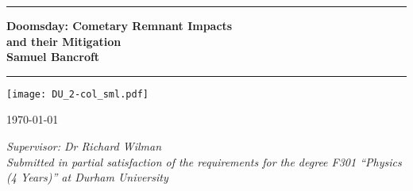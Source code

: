 \documentclass[12pt]{book}
\begin{document}
{\let\cleardoublepage\clearpage 

\titlepage


{
  \thispagestyle{empty}
  {\parindent0cm
   \rule{\linewidth}{.7ex}}
  \begin{flushright}

    \sffamily\bfseries\Huge
    Doomsday: Cometary Remnant Impacts\\and their Mitigation\\
    \sffamily\bfseries\large
    Samuel Bancroft
  \end{flushright}
  \rule{\linewidth}{.7ex}
  
\vspace{3ex}
\small{
\begin{center}%
  {\bfseries \vspace{-.5em}{Abstract}}%
\end{center}%
\vspace{-3ex}
\noindent \quotation{\lipsum[100]}
}

  \begin{center}
    \texttt{[image: DU\_2-col\_sml.pdf]}
  \end{center}
  \begin{center}\sffamily\LARGE{\today}\end{center}

  \thispagestyle{empty}

  \begin{center}
  \large \emph{Supervisor: Dr Richard Wilman}\\
  \vspace{5ex}
  \emph{Submitted in partial satisfaction of the requirements for the degree
F301 ``Physics (4 Years)'' at Durham University}
  \end{center}
}

\endtitlepage

  \tableofcontents

  \mainmatter\setcounter{page}{1}
  
  


  \backmatter
  
  \markboth{}{}


  
} %
\end{document}
